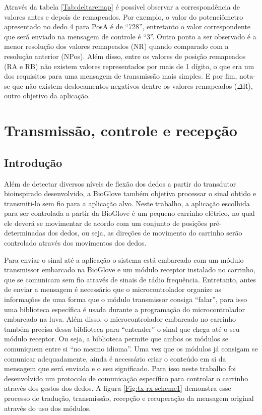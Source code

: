 \documentclass[
	12pt,				%
	openright,			%
	oneside,			%
	a4paper,			%
	english,			%
	brazil				%
	]{abntex2}
\begin{document}
		Através da tabela \ref{Tab:deltaremap} é possível observar a correspondência de valores antes e depois de remapeados. Por exemplo, o valor do potenciômetro apresentado no dedo 4 para PosA é de ``728'', entretanto o valor correspondente que será enviado na mensagem de controle é ``3''. Outro ponto a ser observado é a menor resolução dos valores remapeados (NR) quando comparado com a resolução anterior (NPos). Além disso, entre os valores de posição remapeados (RA e RB) não existem valores representados por mais de 1 dígito, o que era um dos requisitos para uma mensagem de transmissão mais simples. E por fim, nota-se que não existem deslocamentos negativos dentre os valores remapeados ($\Delta$R), outro objetivo da aplicação.

	
		\section{Transmissão, controle e recepção}

		\subsection{Introdução}

		Além de detectar diversos níveis de flexão dos dedos a partir do transdutor bioinspirado desenvolvido, a BioGlove também objetiva processar o sinal obtido e transmiti-lo sem fio para a aplicação alvo. Neste trabalho, a aplicação escolhida para ser controlada a partir da BioGlove é um pequeno carrinho elétrico, no qual ele deverá se movimentar de acordo com um conjunto de posições pré-determinadas dos dedos, ou seja, as direções de movimento do carrinho serão controlado através dos movimentos dos dedos.

		Para enviar o sinal até a aplicação o sistema está embarcado com um módulo transmissor embarcado na BioGlove e um módulo receptor instalado no carrinho, que se comunicam sem fio através de sinais de rádio frequência. Entretanto, antes de enviar a mensagem é necessário que o microcontrolador organize as informações de uma forma que o módulo transmissor consiga ``falar'', para isso uma biblioteca específica é usada durante a programação do microcontrolador embarcado na luva. Além disso, o microcontrolador embarcado no carrinho também precisa dessa biblioteca para ``entender'' o sinal que chega até o seu módulo receptor. Ou seja, a biblioteca permite que ambos os módulos se comuniquem entre si ``no mesmo idioma''. Uma vez que os módulos já consigam se comunicar adequadamente, ainda é necessário criar o conteúdo em si da mensagem que será enviada e o seu significado. Para isso neste trabalho foi desenvolvido um protocolo de comunicação específico para controlar o carrinho através dos gestos dos dedos. A figura \ref{Fig:tx-rx-scheme1} demonstra esse processo de tradução, transmissão, recepção e recuperação da mensagem original através do uso dos módulos.
\end{document}
